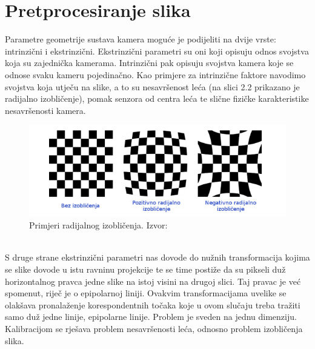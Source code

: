 \documentclass[times, utf8, zavrsni, numeric]{fer}
\begin{document}
\section{Pretprocesiranje slika}
Parametre geometrije sustava kamera moguće je  podijeliti na dvije vrste: intrinzični i ekstrinzični. Ekstrinzični parametri su oni koji opisuju odnos svojstva koja su zajednička kamerama. Intrinzični pak opisuju svojstva kamera koje se odnose svaku kameru pojedinačno. Kao primjere za intrinzične faktore navodimo svojstva koja utječu na slike, a to su nesavršenost leća (na slici 2.2 prikazano je radijalno izobličenje), pomak senzora od centra leća te slične fizičke karakteristike nesavršenosti kamera.\\
\begin{figure}[htb]
\centering
\includegraphics[scale=0.7]{img/slika2.png}
\caption{Primjeri radijalnog izobličenja. Izvor:\citep{bunjevac2017stereo}}
\label{fig:Radial}
\end{figure}\\
S druge strane ekstrinzični parametri nas dovode do nužnih transformacija kojima se slike dovode u istu ravninu projekcije te se time postiže da su pikseli duž horizontalnog pravca jedne slike na istoj visini na drugoj slici. Taj pravac je već spomenut, riječ je o epipolarnoj liniji. Ovakvim transformacijama uvelike se olakšava pronalaženje korespondentnih točaka koje u ovom slučaju treba tražiti samo duž jedne linije, epipolarne linije. Problem je sveden na jednu dimenziju. Kalibracijom se rješava problem nesavršenosti leća, odnosno problem izobličenja slika.\\
\\
\end{document}

